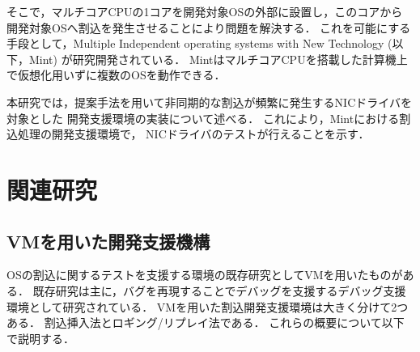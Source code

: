 \documentclass[submit,techreq,noauthor,dvipdfmx]{ipsj}
\begin{document}
そこで，マルチコアCPUの1コアを開発対象OSの外部に設置し，このコアから
開発対象OSへ割込を発生させることにより問題を解決する．
これを可能にする手段として，Multiple Independent operating systems with New Technology (以下，Mint)\cite{senzaki}
が研究開発されている．
MintはマルチコアCPUを搭載した計算機上で仮想化用いずに複数のOSを動作できる．

本研究では，提案手法を用いて非同期的な割込が頻繁に発生するNICドライバを対象とした
開発支援環境の実装について述べる．
これにより，Mintにおける割込処理の開発支援環境で，
NICドライバのテストが行えることを示す．

\section{関連研究}\label{chap:related_reserch}

\subsection{VMを用いた開発支援機構}\label{sec:debugging_support_mechanism_with_VM}

OSの割込に関するテストを支援する環境の既存研究としてVMを用いたものがある．
既存研究は主に，バグを再現することでデバッグを支援するデバッグ支援環境として研究されている．
VMを用いた割込開発支援環境は大きく分けて2つある．
割込挿入法\cite{miyahara}とロギング/リプレイ法\cite{samuel}\cite{jim}\cite{kawasaki}\cite{li2013lore}である．
これらの概要について以下で説明する．
\end{document}
